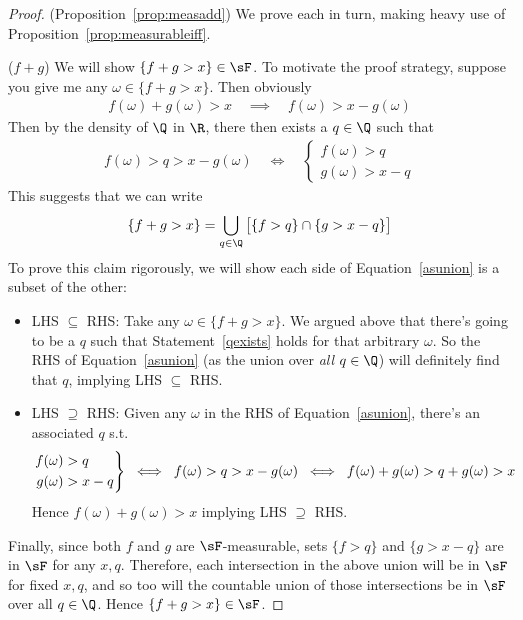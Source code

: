 \documentclass[12pt]{article}
\theoremstyle{plain}
\theoremstyle{definition}
\theoremstyle{remark}
\newenvironment{rcases}
  {\left.\begin{aligned}}
  {\end{aligned}\right\rbrace}
\begin{document}
\begin{proof}(Proposition~\ref{prop:measadd})
We prove each in turn, making heavy use of
Proposition~\ref{prop:measurableiff}.

($f+g$) We will show $\{f+g>x\}\in\sF$. To motivate the proof strategy,
suppose you give me any $\omega\in \{f+g>x\}$. Then obviously
\begin{align*}
  f(\omega) + g(\omega) > x
  \quad\implies\quad
  f(\omega) > x  - g(\omega)
\end{align*}
Then by the density of $\Q$ in $\R$, there then exists a $q\in \Q$ such
that
\begin{align}
  f(\omega) > q > x  - g(\omega)
  \quad\iff\quad
  \begin{cases}
    f(\omega) > q \\
    g(\omega) > x  - q
  \end{cases}
  \label{qexists}
\end{align}
This suggests that we can write
\begin{align}
  \{f+g> x\}
  =
  \bigcup_{q\in \Q}
  \big[
  \{ f > q\}
  \cap
  \{ g > x-q \}
  \big]
  \label{asunion}
\end{align}
To prove this claim rigorously, we will show each side of
Equation~\ref{asunion} is a subset of the other:
\begin{itemize}
  \item LHS $\subseteq$ RHS:
    Take any $\omega\in \{f+g>x\}$.  We argued above that there's
    going to be a $q$ such that Statement~\ref{qexists} holds for
    that arbitrary $\omega$. So the RHS of Equation~\ref{asunion} (as
    the union over \emph{all} $q\in\Q$) will definitely find that $q$,
    implying LHS $\subseteq$ RHS.

  \item LHS $\supseteq$ RHS:
    Given any $\omega$ in the RHS of Equation~\ref{asunion}, there's an
    associated $q$ s.t.
    \begin{align*}
      \begin{rcases}
      f(\omega) &> q \\
      g(\omega) &> x-q
      \end{rcases}
      \;\iff\;
      f(\omega) > q > x-g(\omega)
      \;\iff\;
      f(\omega) + g(\omega) > q + g(\omega)> x
    \end{align*}
    Hence $f(\omega)+g(\omega) > x$ implying LHS $\supseteq$ RHS.
\end{itemize}
Finally, since both $f$ and $g$ are $\sF$-measurable, sets $\{f>q\}$ and
$\{g>x-q\}$ are in $\sF$ for any $x,q$. Therefore, each
intersection in the above union will be in $\sF$ for fixed $x,q$, and so
too will the countable union of those intersections be in $\sF$ over all
$q\in\Q$. Hence $\{f+g>x\}\in\sF$.


\end{proof}
\end{document}
